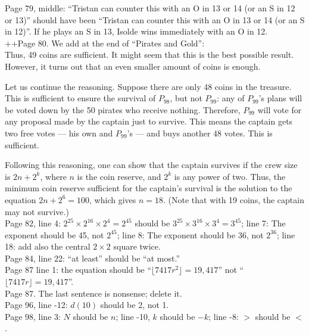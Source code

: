 \documentclass[11pt]{article}
\begin{document}
Page 79, middle:  ``Tristan can counter this with an O in 13 or 14 (or an S in 12 or 13)'' should
have been ``Tristan can counter this with an O in 13 or 14 (or an S in 12)''.  If he plays an S in 13,
Isolde wins immediately with an O in 12.\\

++Page 80. We add at the end of ``Pirates and Gold'':\\

Thus, 49 coins are sufficient.  
It might seem that this is the best possible result.  
However, it turns out that an even smaller amount of coins is enough.  

Let us continue the reasoning.  
Suppose there are only 48 coins in the treasure.  
This is sufficient to ensure the survival of $P_{98}$, but not $P_{99}$: any of $P_{99}$'s plans will be voted down by the 50 pirates who receive nothing.  
Therefore, $P_{99}$ will vote for any proposal made by the captain just to survive.  
This means the captain gets two free votes — his own and $P_{99}$'s — and buys another 48 votes.
This is sufficient.  

Following this reasoning, one can show that the captain survives if the crew size is $2n + 2^k$, where $n$ is the coin reserve, and $2^k$ is any power of two.  
Thus, the minimum coin reserve sufficient for the captain’s survival is the solution to the equation $2n + 2^6 = 100$, which gives $n = 18$.  
(Note that with 19 coins, the captain may not survive.)
\\

Page 82, line 4: $2^{25} \times 2^{16} \times 2^4 = 2^{45}$ should be $3^{25} \times 3^{16} \times 3^4 = 3^{45}$;
line 7: The exponent should be 45, not $2^{45}$;
line 8: The exponent should be 36, not $2^{36}$;
line 18: add also the central $2 \times 2$ square twice.\\

Page 84, line 22: ``at least'' should be ``at most.''\\

Page 87 line 1: the equation should be ``$\lfloor 7417r^2 \rfloor = 19,417$'' not
``$\lfloor 7417r \rfloor = 19,417$''. \\

Page 87.  The last sentence is nonsense; delete it.\\

Page 96, line -12: $d(10)$ should be 2, not 1.\\

Page 98, line 3: $N$ should be $n$; line -10, $k$ should be $-k$; line -8: $>$ should be $<$.\\
\end{document}
